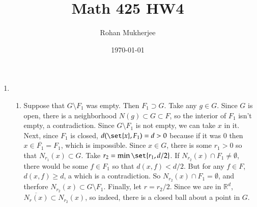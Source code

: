 \documentclass[12pt]{article}
\title{Math 425 HW4}
\date{\today}
\author{Rohan Mukherjee}
\def\mbb#1{\mathbb{#1}}
\def \R{\mbb{R}}
\theoremstyle{definition}
\theoremstyle{remark}
\begin{document}
	\maketitle
	\begin{enumerate}[leftmargin=\labelsep]
		\item \begin{enumerate}
			\item Suppose that $G \setminus F_1$ was empty. Then $F_1 \supset G$. Take any $g \in G$. Since $G$ is open, there is a neighborhood $N(g) \subset G \subset F$, so the interior of $F_1$ isn't empty, a contradiction. Since $G \setminus F_1$ is not empty, we can take $x$ in it. Next, since $F_1$ is closed, $d(\set{x}, F_1) = d > 0$ because if it was 0 then $x \in \overline{F_1} = F_1$, which is impossible. Since $x \in G$, there is some $r_1 > 0$ so that $N_{r_1}(x) \subset G$. Take $r_2 = \min\set{r_1, d/2}$. If $N_{r_2}(x) \cap F_1 \neq \emptyset$, there would be some $f \in F_1$ so that $d(x, f) < d/2$. But for any $f \in F$, $d(x, f) \geq d$, a which is a contradiction. So $N_{r_2}(x) \cap F_1 = \emptyset$, and therfore $N_{r_2}(x) \subset G \setminus F_1$. Finally, let $r = r_2/2$. Since we are in $\R^d$, $\overline{N_r(x)} \subset N_{r_2}(x)$, so indeed, there is a closed ball about a point in $G$.
			

\end{enumerate}
\end{enumerate}
\end{document}
